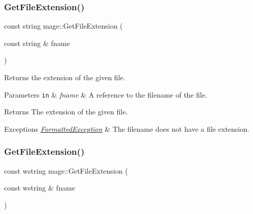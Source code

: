 \hypertarget{namespacemage_a4da638506a9dda4f16c41a1a00c0d0e1}{}\label{namespacemage_a4da638506a9dda4f16c41a1a00c0d0e1} 
\subsubsection{\texorpdfstring{Get\+File\+Extension()}{GetFileExtension()}\hspace{0.1cm}{\footnotesize\ttfamily [1/2]}}
{\footnotesize\ttfamily const string mage\+::\+Get\+File\+Extension (\begin{DoxyParamCaption}\item[{const string \&}]{fname }\end{DoxyParamCaption})}

Returns the extension of the given file.


\begin{DoxyParams}[1]{Parameters}
\mbox{\tt in}  & {\em fname} & A reference to the filename of the file. \\
\hline
\end{DoxyParams}
\begin{DoxyReturn}{Returns}
The extension of the given file. 
\end{DoxyReturn}

\begin{DoxyExceptions}{Exceptions}
{\em \hyperlink{structmage_1_1_formatted_exception}{Formatted\+Exception}} & The filename does not have a file extension. \\
\hline
\end{DoxyExceptions}
\hypertarget{namespacemage_a2818c96634f4c8d49dcc4144395b24ef}{}\label{namespacemage_a2818c96634f4c8d49dcc4144395b24ef} 
\subsubsection{\texorpdfstring{Get\+File\+Extension()}{GetFileExtension()}\hspace{0.1cm}{\footnotesize\ttfamily [2/2]}}
{\footnotesize\ttfamily const wstring mage\+::\+Get\+File\+Extension (\begin{DoxyParamCaption}\item[{const wstring \&}]{fname }\end{DoxyParamCaption})}

